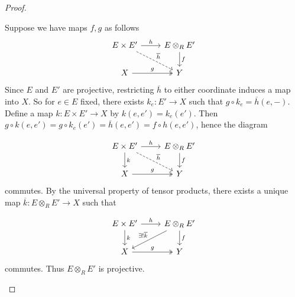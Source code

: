 \documentclass[reqno]{amsart}
\theoremstyle{definition}
\theoremstyle{remark}
\begin{document}
\begin{proof}
\begin{enumerate}
                 Suppose we have maps $f,g$ as follows
                 \begin{equation*}
                 \begin{tikzcd}
                     E \times E' \ar[r, "h"]
                     \ar[dashed, dr, "\overline{h}"] 
                     & E \otimes_R E' \ar[d, "f"] \\
                     X \ar[r, two heads, "g"] & Y
                 \end{tikzcd}
                 \end{equation*}
                 Since $E$ and $E'$ are projective,
                 restricting $\overline{h}$ to either
                 coordinate induces a map
                 into $X$. So for
                 $e \in E$ fixed, there exists
                 $k_e \colon E' \to X$ such that
                 $g \circ k_e = \overline{h}(e,-)$.
                 Define a map
                 $k \colon E \times E' \to X$ by
                 $k\left( e,e' \right) =
                 k_{e}(e')$. Then
                 $g \circ k \left( e,e' \right) 
                 = g \circ k_e (e')
                 = \overline{h}\left( e,e' \right) 
                 = f \circ h \left( e,e' \right) $, hence
                 the diagram
                 
                 \begin{equation*}
                 \begin{tikzcd}
                     E \times E' \ar[r, "h"]
                     \ar[dashed, dr, "\overline{h}"] 
                     \ar[d, "k"]
                     & E \otimes_R E' \ar[d, "f"] \\
                     X \ar[r, two heads, "g"] & Y
                 \end{tikzcd}
                 \end{equation*}
                 commutes.
                 By the universal property of tensor products,
                 there exists a unique map
                 $\overline{k} \colon
                 E \otimes_R E' \to X$ such that

                 \begin{equation*}
                 \begin{tikzcd}
                     E \times E' \ar[r, "h"]
                     \ar[d, "k"]
                     & E \otimes_R E' \ar[d, "f"]
                     \ar[dl, "\exists !\overline{k}"']\\
                     X \ar[r, two heads, "g"] & Y
                 \end{tikzcd}
                 \end{equation*}
                 commutes.
                 Thus $E \otimes_R E'$ is projective.

        \end{enumerate}
    \end{proof}
\end{document}
